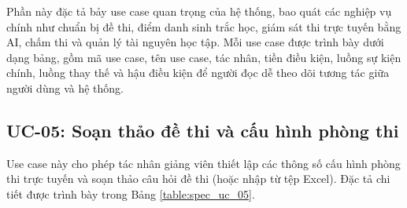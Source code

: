 \documentclass[../DoAn.tex]{subfiles}
\begin{document}
\label{section:2.3}

Phần này đặc tả bảy use case quan trọng của hệ thống, bao quát các nghiệp vụ chính như chuẩn bị đề thi, điểm danh sinh trắc học, giám sát thi trực tuyến bằng AI, chấm thi và quản lý tài nguyên học tập. Mỗi use case được trình bày dưới dạng bảng, gồm mã use case, tên use case, tác nhân, tiền điều kiện, luồng sự kiện chính, luồng thay thế và hậu điều kiện để người đọc dễ theo dõi tương tác giữa người dùng và hệ thống.

\subsection{UC-05: Soạn thảo đề thi và cấu hình phòng thi}

\label{subsection:spec_uc_05}

Use case này cho phép tác nhân giảng viên thiết lập các thông số cấu hình phòng thi trực tuyến và soạn thảo câu hỏi đề thi (hoặc nhập từ tệp Excel). Đặc tả chi tiết được trình bày trong Bảng \ref{table:spec_uc_05}.
\end{document}
